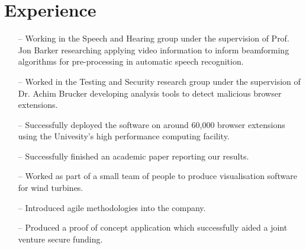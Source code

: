 \documentclass[]{deedy-resume-openfont}
\begin{document}
\begin{minipage}[t]{0.66\textwidth}


\section{Experience}


\begin{enumerate}[leftmargin=0.4cm, itemsep=-0.3ex, topsep=0pt]
\item[--] Working in the Speech and Hearing group under the supervision of Prof. Jon Barker researching applying video information to inform beamforming algorithms for pre-processing in automatic speech recognition.
\end{enumerate}
\sectionsep


\begin{enumerate}[leftmargin=0.4cm, itemsep=-0.3ex, topsep=0pt]
\item[--] Worked in the Testing and Security research group under the supervision of Dr. Achim Brucker developing analysis tools to detect malicious browser extensions.
\item[--] Successfully deployed the software on around 60,000 browser extensions using the Univesity's high performance computing facility.
\item[--] Successfully finished an academic paper reporting our results.
\end{enumerate}
\sectionsep

\begin{enumerate}[leftmargin=0.4cm, itemsep=-0.3ex, topsep=0pt]
\item[--] Worked as part of a small team of people to produce visualisation software for wind turbines.
\item[--] Introduced agile methodologies into the company.
\item[--] Produced a proof of concept application which successfully aided a joint venture secure funding.
\end{enumerate}
\sectionsep



\end{minipage}
\end{document}

